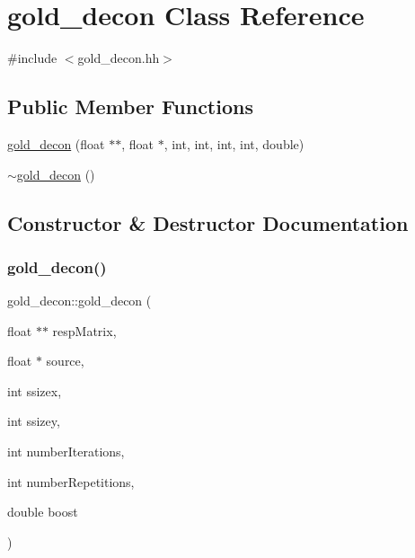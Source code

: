 \hypertarget{classgold__decon}{}\section{gold\+\_\+decon Class Reference}
\label{classgold__decon}


{\ttfamily \#include $<$gold\+\_\+decon.\+hh$>$}

\subsection*{Public Member Functions}
\begin{DoxyCompactItemize}
\item 
\mbox{\hyperlink{classgold__decon_a922e3b6065ca68996e30abd173c3723d}{gold\+\_\+decon}} (float $\ast$$\ast$, float $\ast$, int, int, int, int, double)
\item 
\mbox{\hyperlink{classgold__decon_a093b144182a8c8045c0ebd9eff0b2f96}{$\sim$gold\+\_\+decon}} ()
\end{DoxyCompactItemize}


\subsection{Constructor \& Destructor Documentation}
\mbox{\label{classgold__decon_a922e3b6065ca68996e30abd173c3723d}} 
\subsubsection{\texorpdfstring{gold\+\_\+decon()}{gold\_decon()}}
{\footnotesize\ttfamily gold\+\_\+decon\+::gold\+\_\+decon (\begin{DoxyParamCaption}\item[{float $\ast$$\ast$}]{resp\+Matrix,  }\item[{float $\ast$}]{source,  }\item[{int}]{ssizex,  }\item[{int}]{ssizey,  }\item[{int}]{number\+Iterations,  }\item[{int}]{number\+Repetitions,  }\item[{double}]{boost }\end{DoxyParamCaption})}

\mbox{\label{classgold__decon_a093b144182a8c8045c0ebd9eff0b2f96}} 
